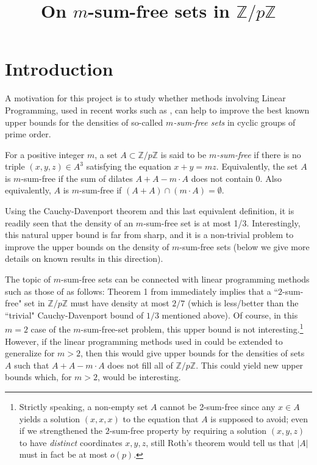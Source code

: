 \documentclass[a4paper,12pt,reqno]{amsart}
\newcommand{\1}{\mathbf{1}}
\newcommand{\0}{\mathbf{0}}
\theoremstyle{definition}
\newcommand{\mb}{\mathbb}
\begin{document}
\title{On $m$-sum-free sets in $\mb{Z}/p\mb{Z}$}

\author{}

\maketitle

\section{Introduction}

A motivation for this project is to study whether methods involving Linear Programming, used in recent works such as \cite{LMPV}, can help to improve the best known upper bounds for the densities of so-called \emph{$m$-sum-free sets} in cyclic groups of prime order. 

For a positive integer $m$, a set $A\subset \mb{Z}/p\mb{Z}$ is said to be \emph{$m$-sum-free} if there is no triple $(x,y,z)\in A^3$ satisfying the equation $x+y=mz$. Equivalently, the set $A$ is $m$-sum-free if the sum of dilates $A+A-m\cdot A$ does not contain $0$. Also equivalently, $A$ is $m$-sum-free if $(A+A)\cap (m\cdot A) =\emptyset$.

Using the Cauchy-Davenport theorem and this last equivalent definition, it is readily seen that the density of an $m$-sum-free set is at most 1/3. Interestingly, this natural upper bound is far from sharp, and it is a non-trivial problem to improve the upper bounds on the density of $m$-sum-free sets (below we give more details on known results in this direction).

The topic of $m$-sum-free sets can be connected with linear programming methods such as those of \cite{LMPV} as follows:  Theorem 1 from \cite{LMPV} immediately implies that a ``$2$-sum-free" set in $\mb{Z}/p\mb{Z}$ must have density at most $2/7$ (which is less/better than the ``trivial" Cauchy-Davenport bound of $1/3$ mentioned above). Of course, in this $m=2$ case of the $m$-sum-free-set problem, this upper bound is not interesting.\footnote{Strictly speaking, a non-empty set $A$ cannot be 2-sum-free since any $x\in A$ yields a solution $(x,x,x)$ to the equation that $A$ is supposed to avoid; even if we strengthened the $2$-sum-free property by requiring a solution $(x,y,z)$ to have \emph{distinct} coordinates $x,y,z$, still Roth's theorem would tell us that $|A|$ must in fact be at most $o(p)$.} However, if the linear programming methods used in \cite{LMPV} could be extended to generalize \cite[Theorem 1]{LMPV} for $m>2$, then this would give upper bounds for the densities of sets $A$ such that  $A+A-m\cdot A$ does not fill all of $\mb{Z}/p\mb{Z}$. This could yield new upper bounds which, for $m>2$, would be interesting.
\end{document}
